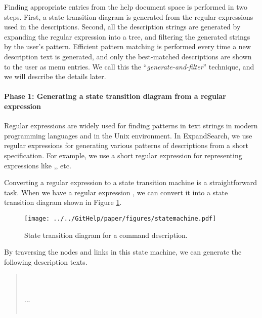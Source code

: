 \documentclass[manuscript,anonymous,review]{acmart}
\def\ES{\textsf{ExpandSearch}}
\begin{document}
Finding appropriate entries from the
help document space is
performed in two steps.
First, a state transition diagram is generated from the regular expressions
used in the descriptions.
Second, all the description strings are generated by expanding the regular expression
into a tree, and filtering the generated strings by the user's pattern.
Efficient pattern matching is performed every time a new description text is generated,
and only the best-matched descriptions are shown to the user as menu entries.
We call this the ``\textit{generate-and-filter}'' technique,
and we will describe the details later.

\paragraph{Phase 1: Generating a state transition diagram from a regular expression}

Regular expressions are widely used for finding patterns in text strings
in modern programming languages and in the Unix environment.
In {\ES}, we use regular expressions for
generating various patterns of descriptions from a short specification.
For example, we use a short regular expression
for representing expressions like
,, etc.

Converting a regular expression to a state transition machine is a
straightforward task.
When we have a regular expression
, 
we can convert it into a state transition diagram
shown in Figure \ref{statemachine1}.

\begin{figure}[htb]
\texttt{[image: ../../GitHelp/paper/figures/statemachine.pdf]}
\caption{State transition diagram for a  command description.}
\label{statemachine1}
\end{figure}

By traversing the nodes and links in this state machine,
we can generate the following description texts.

\begin{quote}
\small
{} \\
 \\
...\\
\\
\end{quote}
\end{document}
